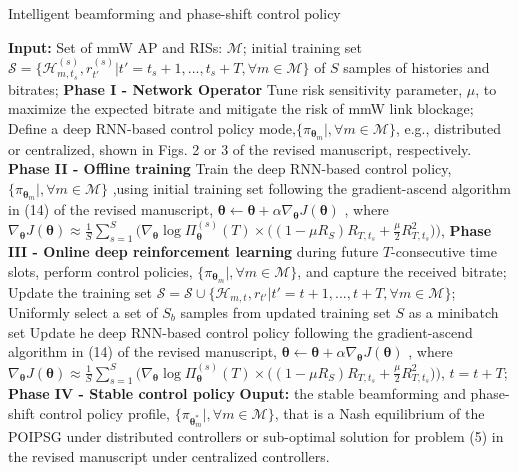 \documentclass[conference]{IEEEtran}
\begin{document}
\begin{algorithm}[!t]
\caption{\small{Intelligent beamforming and phase-shift control policy}} \label{algorithm-E}
\small{
\begin{algorithmic}[1]
\State \textbf{Input:} Set of mmW AP and RISs: $\mathcal{M}$; initial training set $\mathcal{S}=\{\mathcal{H}^{(s)}_{m,t_s},r_{t'}^{(s)}|t'=t_s+1,...,t_s+T, \forall m\in \mathcal{M}\}$ of $S$ samples of histories and bitrates;
\State \textbf{Phase I - Network Operator}
\State Tune risk sensitivity parameter, $\mu$, to  maximize the expected bitrate and mitigate the risk of mmW link blockage;
\State Define a deep RNN-based control policy mode,$\{\pi_{\boldsymbol{\theta}_m}|,\forall m\in \mathcal{M}\}$, e.g., distributed or centralized, shown in Figs. 2 or 3 of the revised manuscript, respectively.
\State \textbf{Phase II - Offline training}
\State Train the deep RNN-based control policy, $\{\pi_{\boldsymbol{\theta}_m}|,\forall m\in \mathcal{M}\}$ ,using initial training set following the gradient-ascend algorithm in (14) of the revised manuscript, $\boldsymbol{\theta}\leftarrow \boldsymbol{\theta}+\alpha \nabla_{\boldsymbol{\theta}}J(\boldsymbol{\theta})$ , where $\nabla_{\boldsymbol{\theta}}J(\boldsymbol{\theta})\approx \frac{1}{S}\sum_{s=1}^S \Big(\nabla_{\boldsymbol{\theta}}\log\Pi_{\boldsymbol{\theta}}^{(s)}(T) \times \big((1-\mu R_S) R_{T,t_s}+\frac{\mu}{2}R_{T,t_s}^2\big)\Big)$,
\State \textbf{Phase III - Online deep reinforcement learning}
\Repeat
{}
\EndFor
\State during future $T$-consecutive time slots, perform control policies, $\{\pi_{\boldsymbol{\theta}_m}|,\forall m\in \mathcal{M}\}$, and capture the received bitrate;
\State Update the training set $\mathcal{S}=\mathcal{S} \cup \{\mathcal{H}_{m,t},r_{t'}|t'=t+1,...,t+T, \forall m\in \mathcal{M}\}$;
\State Uniformly select a set of $S_{b}$ samples from updated training set $S$ as a minibatch set
\State Update he deep RNN-based control policy following the gradient-ascend algorithm in (14) of the revised manuscript, $\boldsymbol{\theta}\leftarrow \boldsymbol{\theta}+\alpha \nabla_{\boldsymbol{\theta}}J(\boldsymbol{\theta})$ , where $\nabla_{\boldsymbol{\theta}}J(\boldsymbol{\theta})\approx \frac{1}{S}\sum_{s=1}^S \Big(\nabla_{\boldsymbol{\theta}}\log\Pi_{\boldsymbol{\theta}}^{(s)}(T) \times \big((1-\mu R_S) R_{T,t_s}+\frac{\mu}{2}R_{T,t_s}^2\big)\Big)$,
\State $t=t+T$;
\State \textbf{Phase IV - Stable control policy}
\State \textbf{Ouput:} the stable beamforming and phase-shift control policy profile, $\{\pi_{\boldsymbol{\theta}^*_m}|,\forall m\in \mathcal{M}\}$, that is a Nash equilibrium of the POIPSG under distributed controllers or sub-optimal solution for problem (5) in the revised manuscript under centralized controllers.
\end{algorithmic}
}
\end{algorithm}
\end{document}
